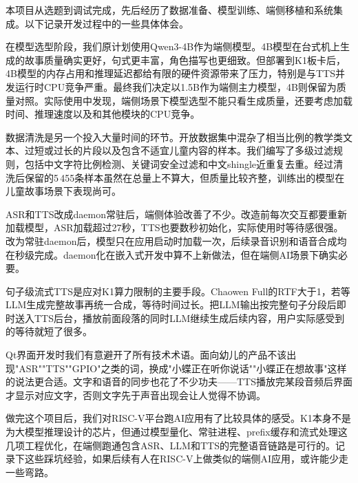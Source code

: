 \documentclass[lettersize,journal]{IEEEtran}
\begin{document}
本项目从选题到调试完成，先后经历了数据准备、模型训练、端侧移植和系统集成。以下记录开发过程中的一些具体体会。

在模型选型阶段，我们原计划使用Qwen3-4B作为端侧模型。4B模型在台式机上生成的故事质量确实更好，句式更丰富，角色描写也更细致。但部署到K1板卡后，4B模型的内存占用和推理延迟都给有限的硬件资源带来了压力，特别是与TTS并发运行时CPU竞争严重。最终我们决定以1.5B作为端侧主力模型，4B则保留为质量对照。实际使用中发现，端侧场景下模型选型不能只看生成质量，还要考虑加载时间、推理速度以及和其他模块的CPU竞争。

数据清洗是另一个投入大量时间的环节。开放数据集中混杂了相当比例的教学类文本、过短或过长的片段以及包含不适宜儿童内容的样本。我们编写了多级过滤规则，包括中文字符比例检测、关键词安全过滤和中文shingle近重复去重。经过清洗后保留的5\,455条样本虽然在总量上不算大，但质量比较齐整，训练出的模型在儿童故事场景下表现尚可。

ASR和TTS改成daemon常驻后，端侧体验改善了不少。改造前每次交互都要重新加载模型，ASR加载超过27秒，TTS也要数秒初始化，实际使用时等待感很强。改为常驻daemon后，模型只在应用启动时加载一次，后续录音识别和语音合成均在秒级完成。daemon化在嵌入式开发中算不上新做法，但在端侧AI场景下确实必要。

句子级流式TTS是应对K1算力限制的主要手段。Chaowen Full的RTF大于1，若等LLM生成完整故事再统一合成，等待时间过长。把LLM输出按完整句子分段后即时送入TTS后台，播放前面段落的同时LLM继续生成后续内容，用户实际感受到的等待就短了很多。

Qt界面开发时我们有意避开了所有技术术语。面向幼儿的产品不该出现"ASR""TTS""GPIO"之类的词，换成"小蝶正在听你说话""小蝶正在想故事"这样的说法更合适。文字和语音的同步也花了不少功夫——TTS播放完某段音频后界面才显示对应文字，否则文字先于声音出现会让人觉得不协调。

做完这个项目后，我们对RISC-V平台跑AI应用有了比较具体的感受。K1本身不是为大模型推理设计的芯片，但通过模型量化、常驻进程、prefix缓存和流式处理这几项工程优化，在端侧跑通包含ASR、LLM和TTS的完整语音链路是可行的。记录下这些踩坑经验，如果后续有人在RISC-V上做类似的端侧AI应用，或许能少走一些弯路。

\end{document}
